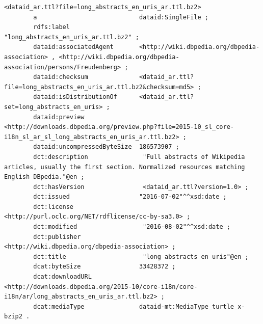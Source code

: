 \documentclass[a4paper,english,twoside,BCOR1.5cm,headsepline,DIV12,appendixprefix,final,12pt]{scrbook}
\begin{document}
\begin{lstlisting}[language=ttl, captionpos=b, label=lst:dcex,linewidth=\columnwidth,breaklines=true,basicstyle=\ttfamily\scriptsize]
<dataid_ar.ttl?file=long_abstracts_en_uris_ar.ttl.bz2>
        a                            dataid:SingleFile ;
        rdfs:label                   "long_abstracts_en_uris_ar.ttl.bz2" ;
        dataid:associatedAgent       <http://wiki.dbpedia.org/dbpedia-association> , <http://wiki.dbpedia.org/dbpedia-association/persons/Freudenberg> ;
        dataid:checksum              <dataid_ar.ttl?file=long_abstracts_en_uris_ar.ttl.bz2&checksum=md5> ;
        dataid:isDistributionOf      <dataid_ar.ttl?set=long_abstracts_en_uris> ;
        dataid:preview               <http://downloads.dbpedia.org/preview.php?file=2015-10_sl_core-i18n_sl_ar_sl_long_abstracts_en_uris_ar.ttl.bz2> ;
        dataid:uncompressedByteSize  186573907 ;
        dct:description               "Full abstracts of Wikipedia articles, usually the first section. Normalized resources matching English DBpedia."@en ;
        dct:hasVersion                <dataid_ar.ttl?version=1.0> ;
        dct:issued                   "2016-07-02"^^xsd:date ;
        dct:license                   <http://purl.oclc.org/NET/rdflicense/cc-by-sa3.0> ;
        dct:modified                  "2016-08-02"^^xsd:date ;
        dct:publisher                 <http://wiki.dbpedia.org/dbpedia-association> ;
        dct:title                     "long abstracts en uris"@en ;
        dcat:byteSize                33428372 ;
        dcat:downloadURL             <http://downloads.dbpedia.org/2015-10/core-i18n/core-i18n/ar/long_abstracts_en_uris_ar.ttl.bz2> ;
        dcat:mediaType               dataid-mt:MediaType_turtle_x-bzip2 .
        

\end{lstlisting}
\end{document}
